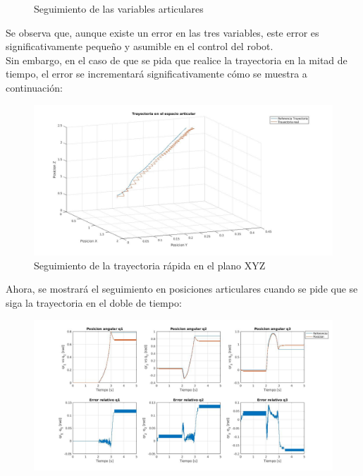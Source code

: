 \begin{itemize}
\begin{figure}[h!]
		\caption{Seguimiento de las variables articulares}
		
	\end{figure}
	
	
	
	\newpage
	
	Se observa que, aunque existe un error en las tres variables, este error es significativamente pequeño y asumible en el control del robot.\\
	
	Sin embargo, en el caso de que se pida que realice la trayectoria en la mitad de tiempo, el error se incrementará significativamente cómo se muestra a continuación:
	
	
	
	\begin{figure}[h!]
		
		\centering
		
		\includegraphics[width=.8\textwidth]{exp4_trayPDidealSR_rapido}
		
		\caption{Seguimiento de la trayectoria rápida en el plano XYZ}
		
	\end{figure}
	
	
	
	\newpage
	
	Ahora, se mostrará el seguimiento en posiciones articulares cuando se pide que se siga la trayectoria en el doble de tiempo:
	
	
	
	\begin{figure}[h!]
		
		\centering
		
		\includegraphics[width=.8\textwidth]{exp4_posPDidealSR_rapido}
		

\end{figure}
\end{itemize}
